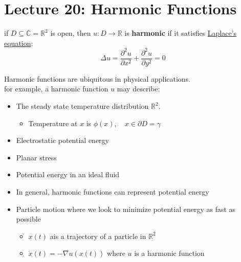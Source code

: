 \chapter{Lecture 20: Harmonic Functions}

\begin{definition}
    if $D \subseteq \mathbb{C} = \mathbb{R}^2$ is open, then $u: D \rightarrow \mathbb{R}$ is \textbf{harmonic} if it satisfies \underline{Laplace's equation}:
    $$\Delta u = \frac{\partial^2 u}{\partial x^2} + \frac{\partial^2 u}{\partial y^2} = 0$$
\end{definition}

\begin{remark}
    Harmonic functions are ubiquitous in physical applications.\\
    for example, a harmonic function $u$ may describe:
    \begin{itemize}
        \item The steady state temperature distribution $\mathbb{R}^2$.
              \begin{itemize}
                  \item Temperature at $x$ is $\phi(x), \quad x \in \partial D = \gamma$
              \end{itemize}
    \end{itemize}

    \begin{itemize}
        \item Electrostatic potential energy
        \item Planar stress
        \item Potential energy in an ideal fluid
        \item In general, harmonic functions can represent potential energy
        \item Particle motion where we look to minimize potential energy as fast as possible
              \begin{itemize}
                  \item $x(t)$ ais a trajectory of a particle in $\mathbb{R}^2$
                  \item $\dot{x}(t) = -\nabla u(x(t))$ where $u$ is a harmonic function
              \end{itemize}
    \end{itemize}
\end{remark}

